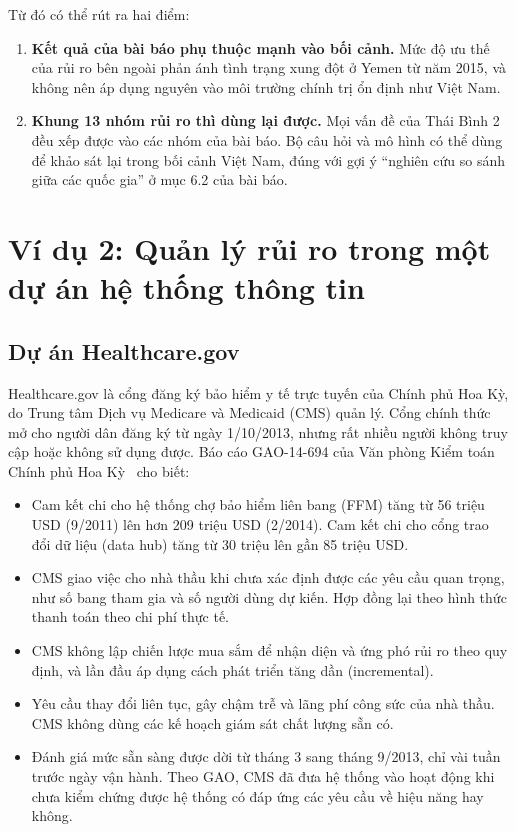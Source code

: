 Từ đó có thể rút ra hai điểm:
\begin{enumerate}
  \item \textbf{Kết quả của bài báo phụ thuộc mạnh vào bối cảnh.} Mức độ ưu thế của rủi ro bên ngoài phản ánh tình trạng xung đột ở Yemen từ năm 2015, và không nên áp dụng nguyên vào môi trường chính trị ổn định như Việt Nam.
  \item \textbf{Khung 13 nhóm rủi ro thì dùng lại được.} Mọi vấn đề của Thái Bình 2 đều xếp được vào các nhóm của bài báo. Bộ câu hỏi và mô hình có thể dùng để khảo sát lại trong bối cảnh Việt Nam, đúng với gợi ý ``nghiên cứu so sánh giữa các quốc gia'' ở mục 6.2 của bài báo.
\end{enumerate}

\section{Ví dụ 2: Quản lý rủi ro trong một dự án hệ thống thông tin}
\label{sec:vi-du-httt}

\subsection{Dự án Healthcare.gov}

Healthcare.gov là cổng đăng ký bảo hiểm y tế trực tuyến của Chính phủ Hoa Kỳ, do Trung tâm Dịch vụ Medicare và Medicaid (CMS) quản lý. Cổng chính thức mở cho người dân đăng ký từ ngày 1/10/2013, nhưng rất nhiều người không truy cập hoặc không sử dụng được. Báo cáo GAO-14-694 của Văn phòng Kiểm toán Chính phủ Hoa Kỳ~\cite{gao2014} cho biết:
\begin{itemize}
  \item Cam kết chi cho hệ thống chợ bảo hiểm liên bang (FFM) tăng từ 56 triệu USD (9/2011) lên hơn 209 triệu USD (2/2014). Cam kết chi cho cổng trao đổi dữ liệu (data hub) tăng từ 30 triệu lên gần 85 triệu USD.
  \item CMS giao việc cho nhà thầu khi chưa xác định được các yêu cầu quan trọng, như số bang tham gia và số người dùng dự kiến. Hợp đồng lại theo hình thức thanh toán theo chi phí thực tế.
  \item CMS không lập chiến lược mua sắm để nhận diện và ứng phó rủi ro theo quy định, và lần đầu áp dụng cách phát triển tăng dần (incremental).
  \item Yêu cầu thay đổi liên tục, gây chậm trễ và lãng phí công sức của nhà thầu. CMS không dùng các kế hoạch giám sát chất lượng sẵn có.
  \item Đánh giá mức sẵn sàng được dời từ tháng 3 sang tháng 9/2013, chỉ vài tuần trước ngày vận hành. Theo GAO, CMS đã đưa hệ thống vào hoạt động khi chưa kiểm chứng được hệ thống có đáp ứng các yêu cầu về hiệu năng hay không.
\end{itemize}

